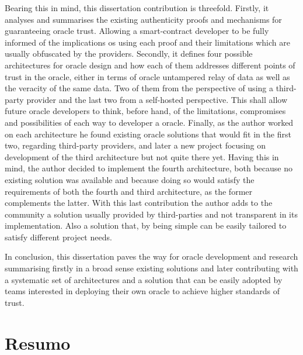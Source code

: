 Bearing this in mind, this dissertation contribution is threefold. Firstly, it analyses and summarises the existing authenticity proofs and mechanisms for guaranteeing oracle trust. Allowing a smart-contract developer to be fully informed of the implications os using each proof and their limitations which are usually obfuscated by the providers. Secondly, it defines four possible architectures for oracle design and how each of them addresses different points of trust in the oracle, either in terms of oracle untampered relay of data as well as the veracity of the same data. Two of them from the perspective of using a third-party provider and the last two from a self-hosted perspective. This shall allow future oracle developers to think, before hand, of the limitations, compromises and possibilities of each way to developer a oracle. Finally, as the author worked on each architecture he found existing oracle solutions that would fit in the first two, regarding third-party providers, and later a new project focusing on development of the third architecture but not quite there yet. Having this in mind, the author decided to implement the fourth architecture, both because no existing solution was available and because doing so would satisfy the requirements of both the fourth and third architecture, as the former complements the latter. With this last contribution the author adds to the community a solution usually provided by third-parties and not transparent in its implementation. Also a solution that, by being simple can be easily tailored to satisfy different project needs.

In conclusion, this dissertation paves the way for oracle development and research summarising firstly in a broad sense existing solutions and later contributing with a systematic set of architectures and a solution that can be easily adopted by teams interested in deploying their own oracle to achieve higher standards of trust.


\chapter*{Resumo}





